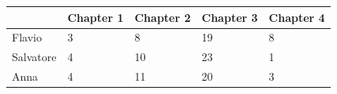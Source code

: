 \begin{table}[H]
\centering
\begin{tabular}{|l|p{2.5cm}|p{2.5cm}|p{2.5cm}|p{2.5cm}|}
\hline
          & Chapter 1 & Chapter 2 & Chapter 3 & Chapter 4 \\ \hline
Flavio    &   3       &    8       &   19        &  8        \\ \hline
Salvatore &   4       &    10       &   23        &  1         \\ \hline
Anna      &   4       &    11       &   20        &  3          \\ \hline
\end{tabular}
\end{table}